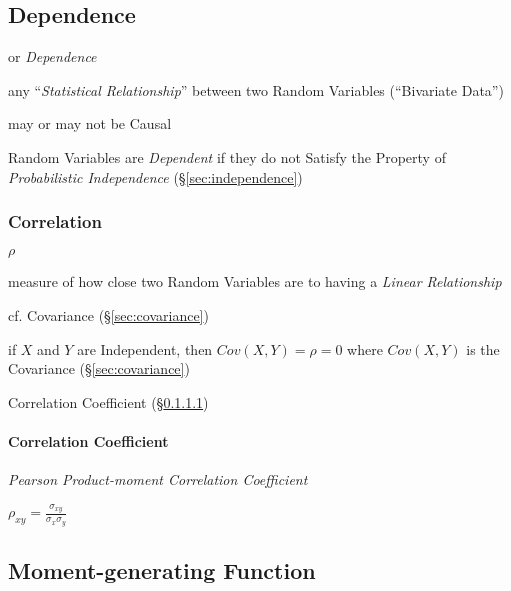 \subsection{Dependence}\label{sec:dependence}

or \emph{Dependence}

any ``\emph{Statistical Relationship}'' between two Random Variables
(``Bivariate Data'')

may or may not be Causal

Random Variables are \emph{Dependent} if they do not Satisfy the Property of
\emph{Probabilistic Independence} (\S\ref{sec:independence})



\subsubsection{Correlation}\label{sec:statistical_correlation}

$\rho$

measure of how close two Random Variables are to having a \emph{Linear
  Relationship}

cf. Covariance (\S\ref{sec:covariance})

if $X$ and $Y$ are Independent, then $Cov(X,Y) = \rho = 0$ where $Cov(X,Y)$ is
the Covariance (\S\ref{sec:covariance})

\fist Correlation Coefficient (\S\ref{sec:correlation_coefficient})



\paragraph{Correlation Coefficient}\label{sec:correlation_coefficient}\hfill

\emph{Pearson Product-moment Correlation Coefficient}

$\rho_{xy} = \frac{\sigma_{xy}}{\sigma_x \sigma_y}$



\subsection{Moment-generating Function}\label{sec:moment_generating_function}

